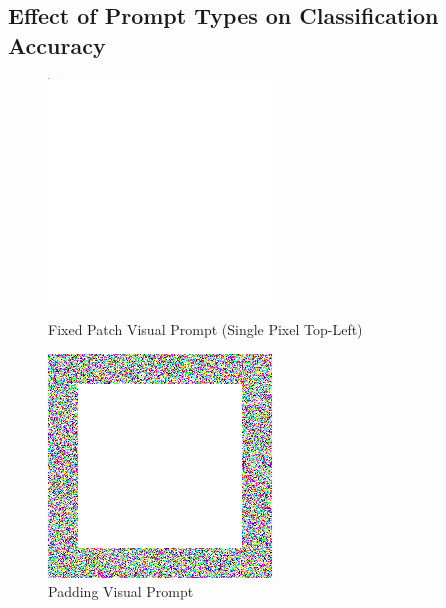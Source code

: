 \documentclass[a4paper]{article}
\begin{document}
\subsection{Effect of Prompt Types on Classification Accuracy}
\begin{figure}[h]
    \centering
    \begin{minipage}[b]{0.45\linewidth}
        \centering
        \includegraphics[width=0.8\linewidth]{"imgs/prompt_fixed_patch.png"}
        \caption{Fixed Patch Visual Prompt (Single Pixel Top-Left)}
        \label{fig:prompt-fixed}
    \end{minipage}
    \hfill
    \begin{minipage}[b]{0.45\linewidth}
        \centering
        \includegraphics[width=0.8\linewidth]{"imgs/prompt_padding.png"}
        \caption{Padding Visual Prompt}
        \label{fig:prompt-padding}
    \end{minipage}
\end{figure}
\end{document}

